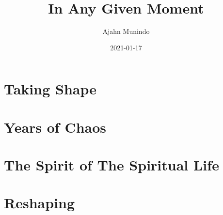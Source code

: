 \documentclass[
  final,
  babelLanguage=british,
  desktopVersion,
]{anecdote}
\title{In Any Given Moment}
\subtitle{}
\author{Ajahn Munindo}
\date{2021-01-17}
\begin{document}
\frontmatter

\ifdesktopversion
\else

\thispagestyle{empty}
\mbox{}
\pagecolor{frontblue}
\newpage
\thispagestyle{empty}
\pagecolor{white}
\mbox{}
\newpage

\fi







\cleartorecto
\tableofcontents*



\mainmatter

\part{Taking Shape}







\part{Years of Chaos}








\part{The Spirit of The Spiritual Life}











\part{Reshaping}
\end{document}
